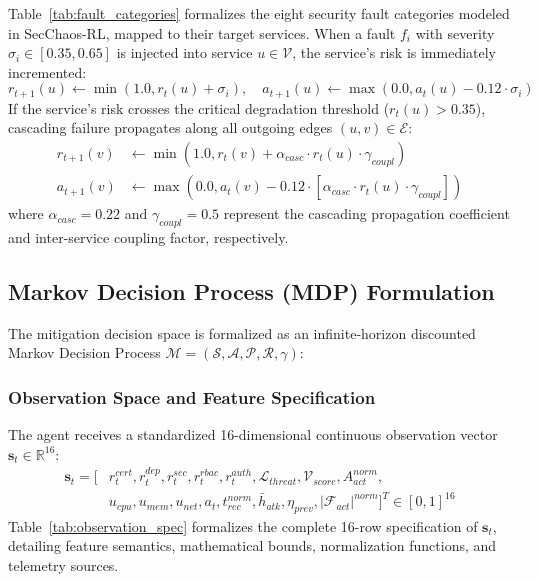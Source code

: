 \documentclass[ASNA,twocolumn]{USG}
\begin{document}
Table~\ref{tab:fault_categories} formalizes the eight security fault categories modeled in SecChaos-RL, mapped to their target services. When a fault $f_i$ with severity $\sigma_i \in [0.35, 0.65]$ is injected into service $u \in \mathcal{V}$, the service's risk is immediately incremented:
\begin{equation}
    r_{t+1}(u) \leftarrow \min\left(1.0, r_t(u) + \sigma_i\right), \quad a_{t+1}(u) \leftarrow \max\left(0.0, a_t(u) - 0.12 \cdot \sigma_i\right)
\end{equation}
If the service's risk crosses the critical degradation threshold ($r_t(u) > 0.35$), cascading failure propagates along all outgoing edges $(u, v) \in \mathcal{E}$:
\begin{align}
    r_{t+1}(v) &\leftarrow \min\left(1.0, r_t(v) + \alpha_{casc} \cdot r_t(u) \cdot \gamma_{coupl}\right) \\
    a_{t+1}(v) &\leftarrow \max\left(0.0, a_t(v) - 0.12 \cdot \left[\alpha_{casc} \cdot r_t(u) \cdot \gamma_{coupl}\right]\right)
\end{align}
where $\alpha_{casc} = 0.22$ and $\gamma_{coupl} = 0.5$ represent the cascading propagation coefficient and inter-service coupling factor, respectively.

\subsection{Markov Decision Process (MDP) Formulation}
The mitigation decision space is formalized as an infinite-horizon discounted Markov Decision Process $\mathcal{M} = (\mathcal{S}, \mathcal{A}, \mathcal{P}, \mathcal{R}, \gamma)$:

\subsubsection{Observation Space and Feature Specification}
The agent receives a standardized 16-dimensional continuous observation vector $\mathbf{s}_t \in \mathbb{R}^{16}$:
\begin{align}
    \mathbf{s}_t = \big[ & r_t^{cert}, r_t^{dep}, r_t^{sec}, r_t^{rbac}, r_t^{auth}, \mathcal{L}_{threat}, \mathcal{V}_{score}, A_{act}^{norm}, \nonumber \\
    & u_{cpu}, u_{mem}, u_{net}, a_t, t_{rec}^{norm}, \bar{h}_{atk}, \eta_{prev}, |\mathcal{F}_{act}|^{norm} \big]^T \in [0, 1]^{16}
\end{align}
Table~\ref{tab:observation_spec} formalizes the complete 16-row specification of $\mathbf{s}_t$, detailing feature semantics, mathematical bounds, normalization functions, and telemetry sources.
\end{document}
